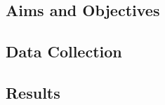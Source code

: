 \lipsum[1]
\subsection{Aims and Objectives}
\lipsum[2-3]
\subsection{Data Collection}
\lipsum[2-3]
\subsection{Results}
\lipsum[2-3]
